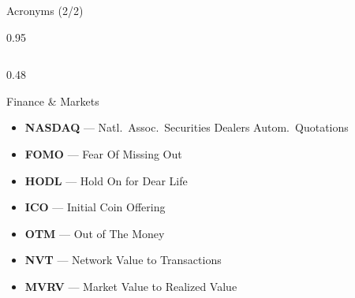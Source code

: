 \documentclass[9pt, aspectratio=169, t]{beamer}
\begin{document}
\begin{frame}{Acronyms (2/2)}
\begin{cminipage}{0.95\textwidth}
{\begin{columns}[T]
\begin{column}{0.48\textwidth}
\begin{alertblock}{Finance \& Markets}
\begin{itemize}
                    \item \textbf{NASDAQ} --- Natl.\ Assoc.\ Securities Dealers Autom.\ Quotations
                    \item \textbf{FOMO} --- Fear Of Missing Out
                    \item \textbf{HODL} --- Hold On for Dear Life
                    \item \textbf{ICO} --- Initial Coin Offering
                    \item \textbf{OTM} --- Out of The Money
                    \item \textbf{NVT} --- Network Value to Transactions
                    \item \textbf{MVRV} --- Market Value to Realized Value
                \end{itemize}
            \end{alertblock}
        \end{column}
    \end{columns}
    }
    \end{cminipage}
\end{frame}
\end{document}
